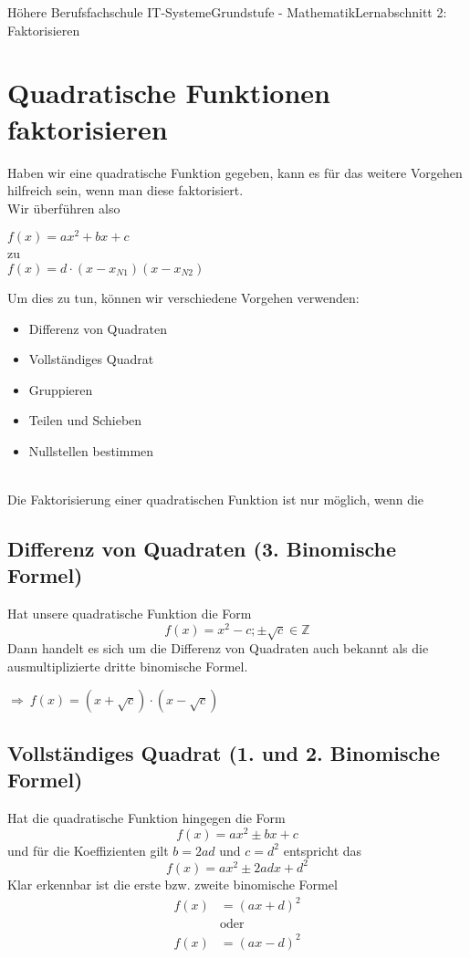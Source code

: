 \documentclass[11pt,twocolumn,oneside,openany,headings=optiontotoc,11pt,numbers=noenddot]{article}
\begin{document}
	\begin{worksheet}{Höhere Berufsfachschule IT-Systeme}{Grundstufe - Mathematik}{Lernabschnitt 2: Faktorisieren}
		\section{Quadratische Funktionen faktorisieren}
		Haben wir eine quadratische Funktion gegeben, kann es für das weitere Vorgehen hilfreich sein, wenn man diese faktorisiert.\\
		Wir überführen also
		\begin{center}
			\colorbox{red!10}{\(f(x) = ax^2 +bx + c \)}\\
			zu\\
			\colorbox{green!10}{\(f(x) = d\cdot(x - x_{N1})(x-x_{N2})\)}
		\end{center}
		Um dies zu tun, können wir verschiedene Vorgehen verwenden:
		\begin{itemize}
			\item Differenz von Quadraten
			\item Vollständiges Quadrat
			\item Gruppieren
			\item Teilen und Schieben
			\item Nullstellen bestimmen
		\end{itemize}
		\begin{framed}
			\noindent
			\normalcolor\\
			Die Faktorisierung einer quadratischen Funktion ist nur möglich, wenn die 
		\end{framed}
		\subsection{Differenz von Quadraten (3. Binomische Formel)}
		Hat unsere quadratische Funktion die Form \[f(x) = x^2 - c; \pm\sqrt{c}\in \mathbb{Z}\]
		Dann handelt es sich um die Differenz von Quadraten auch bekannt als die ausmultiplizierte dritte binomische Formel.\\
		\par\noindent
		\(\Rightarrow\ f(x) = (x+\sqrt{c})\cdot(x-\sqrt{c})\)
		\subsection{Vollständiges Quadrat (1. und 2. Binomische Formel)}
		Hat die quadratische Funktion hingegen die Form \[f(x) = ax^2 \pm bx + c\] und  für die Koeffizienten gilt \(b = 2ad\) und \(c = d^2\) entspricht das \[f(x) = ax^2 \pm 2adx + d^2\]
		Klar erkennbar ist die erste bzw. zweite binomische Formel
		\begin{align*}
			f(x) & = (ax+d)^2\\
			&\text{oder}\\
			f(x) & = (ax-d)^2
		\end{align*}

\end{worksheet}
\end{document}
